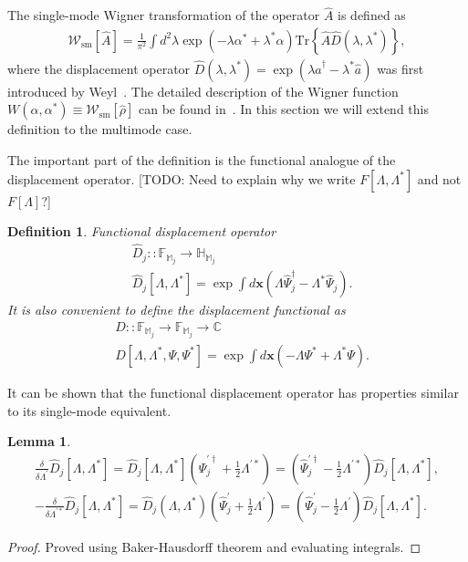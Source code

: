 \documentclass[12pt,aip,jmp,amssymb,amsmath]{revtex4-1}
\newtheorem{definition}{Definition}
\newtheorem{lemma}{Lemma}
\begin{document}
The single-mode Wigner transformation of the operator $\hat{A}$ is defined as
\begin{eqnarray}
    \mathcal{W}_{\mathrm{sm}}[\hat{A}]
    = \frac{1}{\pi^2} \int d^2 \lambda \exp(-\lambda \alpha^* + \lambda^* \alpha)
        \mathrm{Tr} \left\{ \hat{A} \hat{D}(\lambda, \lambda^*) \right\},
\end{eqnarray}
where the displacement operator $\hat{D}(\lambda, \lambda^*) = \exp(\lambda \hat{a}^\dagger - \lambda^* \hat{a})$ was first introduced by Weyl~\cite{Weyl1950}.
The detailed description of the Wigner function $W(\alpha, \alpha^*) \equiv \mathcal{W}_{\mathrm{sm}}[\hat{\rho}]$ can be found in~\cite{Gardiner2004}.
In this section we will extend this definition to the multimode case.

The important part of the definition is the functional analogue of the displacement operator.
[TODO: Need to explain why we write $F[\Lambda, \Lambda^*]$ and not $F[\Lambda]$?]

\begin{definition}
    Functional displacement operator
    \begin{eqnarray*}
        & \hat{D}_j :: \mathbb{F}_{\mathbb{M}_j} \rightarrow \mathbb{H}_{\mathbb{M}_j} \\
        & \hat{D}_j[\Lambda, \Lambda^*] = \exp \int d\boldsymbol{x} \left(
            \Lambda \hat{\Psi}_j^\dagger - \Lambda^* \hat{\Psi}_j
        \right).
    \end{eqnarray*}
    It is also convenient to define the displacement functional as
    \begin{eqnarray*}
        & D :: \mathbb{F}_{\mathbb{M}_j} \rightarrow \mathbb{F}_{\mathbb{M}_j} \rightarrow \mathbb{C} \\
        & D[\Lambda, \Lambda^*, \Psi, \Psi^*] = \exp \int d\boldsymbol{x} \left(
            -\Lambda \Psi^* + \Lambda^* \Psi
        \right).
    \end{eqnarray*}
\end{definition}

It can be shown that the functional displacement operator has properties similar to its single-mode equivalent.

\begin{lemma}
\label{lmm:func-wigner:displacement-derivatives}
    \begin{eqnarray*}
        \frac{\delta}{\delta \Lambda^\prime} \hat{D}_j[\Lambda, \Lambda^*]
        = \hat{D}_j[\Lambda, \Lambda^*] (\hat{\Psi}_j^{\prime\dagger} + \frac{1}{2} \Lambda^{\prime*})
        = (\hat{\Psi}_j^{\prime\dagger} - \frac{1}{2} \Lambda^{\prime*}) \hat{D}_j[\Lambda, \Lambda^*], \\
        -\frac{\delta}{\delta \Lambda^{\prime*}} \hat{D}_j[\Lambda, \Lambda^*]
        = \hat{D}_j(\Lambda, \Lambda^*) (\hat{\Psi}_j^\prime + \frac{1}{2} \Lambda^\prime)
        = (\hat{\Psi}_j^\prime - \frac{1}{2} \Lambda^\prime) \hat{D}_j[\Lambda, \Lambda^*].
    \end{eqnarray*}
\end{lemma}
\begin{proof}
Proved using Baker-Hausdorff theorem and evaluating integrals.
\end{proof}
\end{document}
